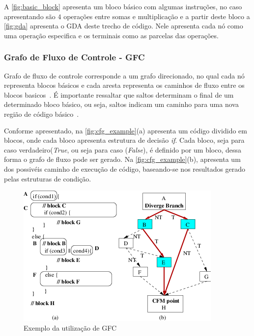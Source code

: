 A \autoref{fig:basic_block} apresenta um bloco básico com algumas instruções, no caso apresentando são $4$ operações entre somas e multiplicação e a partir deste bloco a \autoref{fig:gda} apresenta o GDA deste trecho de código. Nele apresenta cada nó como uma operação especifica e os terminais como as parcelas das operações.

\subsubsection{Grafo de Fluxo de Controle - GFC}

Grafo de fluxo de controle corresponde a um grafo direcionado, no qual cada nó representa blocos básicos e cada aresta representa os caminhos de fluxo entre os blocos basicos~\cite{allen1970control}. É importante ressaltar que saltos determinam o final de um determinado bloco básico, ou seja, saltos indicam um caminho para uma nova região de código básico~\cite{aho2007compilers}.

\par
Conforme apresentado, na \autoref{fig:cfg_example}(a) apresenta um código dividido em blocos, onde cada bloco apresenta estrutura de decisão \textit{if}. Cada bloco, seja para caso verdadeiro(\textit{True}, ou seja para caso (\textit{False}), é definido por um bloco, dessa forma o grafo de fluxo pode ser gerado. Na \autoref{fig:cfg_example}(b), apresenta um dos possivéis caminho de execução de código, baseando-se nos resultados gerado pelas estruturas de condição.

\begin{figure}[H]
	\begin{center}
    \caption{\label{fig:cfg_example}Exemplo da utilização de GFC}
	\includegraphics[scale=0.9]{Figuras/cfg_example(a)(b).png}
	\end{center}
\end{figure}

